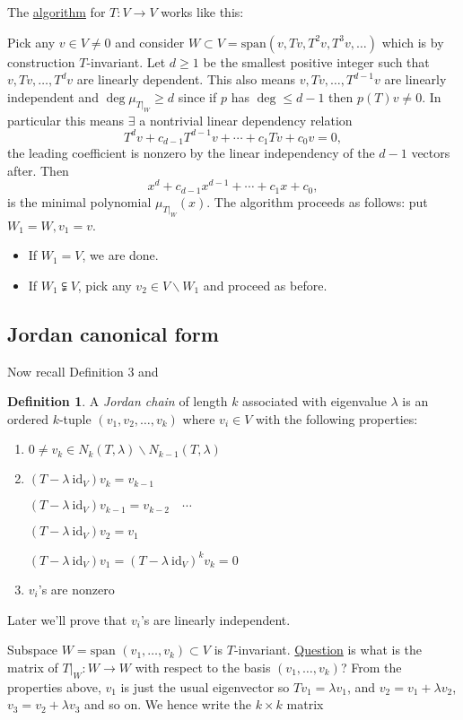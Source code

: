 \documentclass[a4paper]{article}
\theoremstyle{definition}
\newtheorem{defn}{Definition}[subsection]
\begin{document}
The \underline{algorithm} for $T:V\rightarrow V$ works like this:

Pick any $v\in V\neq 0 $ and consider $W\subset V = \text{span} \left(v,Tv,T^2v,T^3v,\ldots \right)$ which is by construction $T$-invariant. Let $d\geq 1$ be the smallest positive integer such that $v,Tv,\ldots,T^dv$ are linearly dependent. This also means $v,Tv,\ldots,T^{d-1}v$ are linearly independent and $\deg \mu_{\left.T\right|_W} \geq d$ since if $p$ has $\deg \leq d-1$ then $p(T)v \neq 0$. In particular this means $\exists$ a nontrivial linear dependency relation
\[
T^dv+c_{d-1}T^{d-1}v+\cdots+c_1Tv+c_0v=0 ,
\]
the leading coefficient is nonzero by the linear independency of the $d-1$ vectors after. Then
\[
x^d+c_{d-1}x^{d-1}+\cdots+c_1 x+c_0 ,
\]
is the minimal polynomial $\mu_{\left. T\right|_W}(x)$. The algorithm proceeds as follows: put $W_1=W,v_1=v$. \begin{itemize}
	\item If $W_1=V$, we are done.
	\item If $W_1 \subsetneqq V$, pick any $v_2\in V\backslash W_1$ and proceed as before.
\end{itemize}

\subsection{Jordan canonical form}
Now recall Definition 3 and 
\begin{defn}
	A \textit{Jordan chain} of length $k$ associated with eigenvalue $\lambda$ is an ordered $k$-tuple $(v_1,v_2,\ldots,v_k)$ where $v_i \in V$ with the following properties:
	\begin{enumerate}
		\item $0\neq v_k \in N_k(T,\lambda)\backslash N_{k-1}(T,\lambda)$
		\item $(T-\lambda \ \text{id}_V)v_k=v_{k-1}$

		$(T-\lambda \ \text{id}_V)v_{k-1}=v_{k-2} \quad \cdots$

		$(T-\lambda \ \text{id}_V)v_2=v_1$

		$(T-\lambda \ \text{id}_V)v_1= (T-\lambda \ \text{id}_V)^k v_k=0$
		\item $v_i$'s are nonzero
	\end{enumerate}
\end{defn}
Later we'll prove that $v_i$'s are linearly independent.

Subspace $W=\text{span }(v_1,\ldots,v_k)\subset V$ is $T$-invariant. \underline{Question} is what is the matrix of $\left. T\right|_W:W\rightarrow W$ with respect to the basis $(v_1,\ldots,v_k)$? From the properties above, $v_1$ is just the usual eigenvector so $Tv_1=\lambda v_1$, and $v_2=v_1+\lambda v_2$, $v_3=v_2+\lambda v_3$ and so on. We hence write the $k\times k$ matrix
\end{document}
